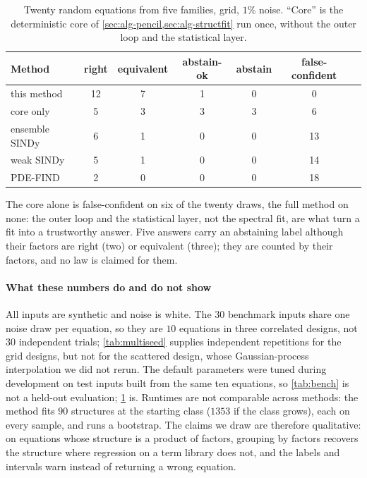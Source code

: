 \begin{table}[tbp]
\centering\small
\caption{Twenty random equations from five families, grid, $1\%$ noise. ``Core'' is the deterministic core of
\cref{sec:alg-pencil,sec:alg-structfit} run once, without the outer loop and the statistical layer.}\label{tab:e13}
\begin{tabular}{@{}lcccccc@{}}
\toprule
Method & right & equivalent & abstain-ok & abstain & false-confident\\
\midrule
this method    & 12 & 7 & 1 & 0 & \phantom{1}0\\
core only      & \phantom{1}5 & 3 & 3 & 3 & \phantom{1}6\\
ensemble SINDy & \phantom{1}6 & 1 & 0 & 0 & 13\\
weak SINDy     & \phantom{1}5 & 1 & 0 & 0 & 14\\
PDE-FIND       & \phantom{1}2 & 0 & 0 & 0 & 18\\
\bottomrule
\end{tabular}
\end{table}

The core alone is false-confident on six of the twenty draws, the full method on none: the outer loop and
the statistical layer, not the spectral fit, are what turn a fit into a trustworthy answer. Five answers carry an abstaining label although their factors are right (two) or equivalent (three); they are
counted by their factors, and no law is claimed for them.

\paragraph{What these numbers do and do not show} All inputs are synthetic and noise is white. The $30$
benchmark inputs share one noise draw per equation, so they are $10$ equations in three correlated
designs, not $30$ independent trials; \cref{tab:multiseed} supplies independent repetitions for the grid designs, but
not for the scattered design, whose Gaussian-process interpolation we did not rerun. The default parameters were tuned during
development on test inputs built from the same ten equations, so \cref{tab:bench} is not a held-out
evaluation; \cref{tab:e13} is. Runtimes are not comparable across methods: the
method fits $90$ structures at the starting class ($1353$ if the class grows), each on every sample, and runs a bootstrap. The claims we draw are
therefore qualitative: on equations whose structure is a product of factors, grouping by factors recovers
the structure where regression on a term library does not, and the labels and intervals warn instead of
returning a wrong equation.
